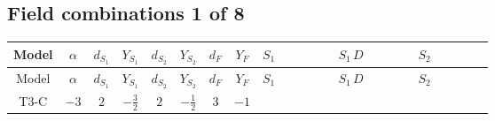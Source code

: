 \documentclass[8pt]{article}
\begin{document}
\begin{landscape}
\subsection*{Field combinations 1 of 8}
\begin{longtable}{@{}cccccccc >{\raggedright\arraybackslash}p{0.21\linewidth} >{\raggedright\arraybackslash}p{0.21\linewidth} >{\raggedright\arraybackslash}p{0.21\linewidth}@{}}
\toprule
Model & $\alpha$ & $d_{S_1}$ & $Y_{S_1}$ & $d_{S_2}$ & $Y_{S_2}$ & $d_F$ & $Y_F$ & $S_1$ & $S_1\,D$ & $S_2$ \\
\midrule
\endfirsthead
\toprule
Model & $\alpha$ & $d_{S_1}$ & $Y_{S_1}$ & $d_{S_2}$ & $Y_{S_2}$ & $d_F$ & $Y_F$ & $S_1$ & $S_1\,D$ & $S_2$ \\
\midrule
\endhead
T3-C & $-3$ & $2$ & $-\frac{3}{2}$ & $2$ & $-\frac{1}{2}$ & $3$ & $-1$ & \scriptsize\adjustbox{max width=\linewidth}{$\begin{gathered} -C_{S_1^\dagger S_1} S_{1,j_1} S_{1,j_1}{}^{\dagger } \\ +\frac{1}{2} \sqrt{3} C_{S_1^\dagger S_1} \hbar  \overline{y_{1,i_1,r_1}} S_{1,j_1} y_{1,i_1,r_1} S_{1,j_1}{}^{\dagger } \\ +\frac{\sqrt{3} C_{S_1^\dagger S_1} \hbar  \overline{y_{1,i_1,r_1}} S_{1,j_1} y_{1,i_1,r_1} S_{1,j_1}{}^{\dagger }}{\epsilon }\end{gathered}$} & \scriptsize\adjustbox{max width=\linewidth}{$\begin{gathered} +D_{\mu _1}\left(S_{1,j_1}\right){}^{\dagger } D_{\mu _1}\left(S_{1,j_1}\right)\end{gathered}$} & \scriptsize\adjustbox{max width=\linewidth}{$\begin{gathered} -C_{S_2^\dagger S_2} S_{2,j_1} S_{2,j_1}{}^{\dagger } \\ +\frac{1}{2} \sqrt{3} C_{S_2^\dagger S_2} \hbar  \overline{y_{2,i_1,r_1}} S_{2,j_1} y_{2,i_1,r_1} S_{2,j_1}{}^{\dagger } \\ +\frac{\sqrt{3} C_{S_2^\dagger S_2} \hbar  \overline{y_{2,i_1,r_1}} S_{2,j_1} y_{2,i_1,r_1} S_{2,j_1}{}^{\dagger }}{\epsilon }\end{gathered}$} \\

\end{longtable}
\end{landscape}
\end{document}

